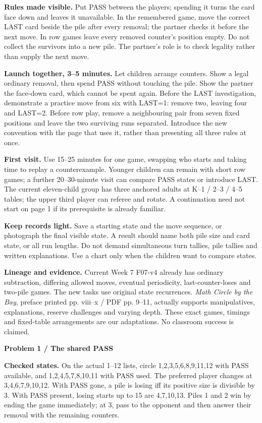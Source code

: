 \documentclass[11pt]{article}
\newcommand{\parttitle}[1]{{\large\bfseries\color{ink}#1}\par}
\newcommand{\labelled}[2]{\textbf{#1} #2\par}
\begin{document}
\labelled{Rules made visible.}{Put PASS between the players; spending it turns the card face down and leaves it unavailable. In the remembered game, move the correct LAST card beside the pile after every removal; the partner checks it before the next move. In row games leave every removed counter's position empty. Do not collect the survivors into a new pile. The partner's role is to check legality rather than supply the next move.}
\labelled{Launch together, 3--5 minutes.}{Let children arrange counters. Show a legal ordinary removal, then spend PASS without touching the pile. Show the partner the face-down card, which cannot be spent again. Before the LAST investigation, demonstrate a practice move from six with LAST=1: remove two, leaving four and LAST=2. Before row play, remove a neighbouring pair from seven fixed positions and leave the two surviving runs separated. Introduce the new convention with the page that uses it, rather than presenting all three rules at once.}
\labelled{First visit.}{Use 15--25 minutes for one game, swapping who starts and taking time to replay a counterexample. Younger children can remain with short row games; a further 20--30-minute visit can compare PASS states or introduce LAST. The current eleven-child group has three anchored adults at K--1 / 2--3 / 4--5 tables; the upper third player can referee and rotate. A continuation need not start on page 1 if its prerequisite is already familiar.}
\labelled{Keep records light.}{Save a starting state and the move sequence, or photograph the final visible state. A result should name both pile size and card state, or all run lengths. Do not demand simultaneous turn tallies, pile tallies and written explanations. Use a chart only when the children want to compare states.}
\labelled{Lineage and evidence.}{Current Week 7 F07-v4 already has ordinary subtraction, differing allowed moves, eventual periodicity, last-counter-loses and two-pile games. The new tasks use original state recurrences. \emph{Math Circle by the Bay}, preface printed pp. viii--x / PDF pp. 9--11, actually supports manipulatives, explanations, reserve challenges and varying depth. These exact games, timings and fixed-table arrangements are our adaptations. No classroom success is claimed.}
\newpage
\parttitle{Problem 1 / The shared PASS}
\labelled{Checked states.}{On the actual 1--12 lists, circle 1,2,3,5,6,8,9,11,12 with PASS available, and 1,2,4,5,7,8,10,11 with PASS used. The preferred player changes at 3,4,6,7,9,10,12. With PASS gone, a pile is losing iff its positive size is divisible by 3. With PASS present, losing starts up to 15 are 4,7,10,13. Piles 1 and 2 win by ending the game immediately; at 3, pass to the opponent and then answer their removal with the remaining counters.}
\end{document}
